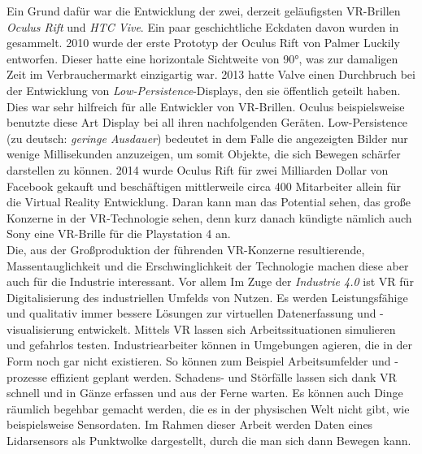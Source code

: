 Ein Grund dafür war die Entwicklung der zwei, derzeit geläufigsten VR-Brillen \textit{Oculus Rift} und \textit{HTC Vive}. Ein paar geschichtliche Eckdaten davon wurden in \cite{bib:RiftHistorical} gesammelt. 2010 wurde der erste Prototyp der Oculus Rift von Palmer Luckily entworfen. Dieser hatte eine horizontale Sichtweite von 90°, was zur damaligen Zeit im Verbrauchermarkt einzigartig war. 2013 hatte Valve einen Durchbruch bei der Entwicklung von \textit{Low-Persistence}-Displays, den sie öffentlich geteilt haben. Dies war sehr hilfreich für alle Entwickler von VR-Brillen. Oculus beispielsweise benutzte diese Art Display bei all ihren nachfolgenden Geräten. Low-Persistence (zu deutsch: \textit{geringe Ausdauer}) bedeutet in dem Falle die angezeigten Bilder nur wenige Millisekunden anzuzeigen, um somit Objekte, die sich Bewegen schärfer darstellen zu können. 2014 wurde Oculus Rift für zwei Milliarden Dollar von Facebook gekauft und beschäftigen mittlerweile circa 400 Mitarbeiter allein für die Virtual Reality Entwicklung. Daran kann man das Potential sehen, das große Konzerne in der VR-Technologie sehen, denn kurz danach kündigte nämlich auch Sony eine VR-Brille für die Playstation 4 an.\\

Die, aus der Großproduktion der führenden VR-Konzerne resultierende, Massentauglichkeit und die Erschwinglichkeit der Technologie machen diese aber auch für die Industrie interessant. Vor allem Im Zuge der \textit{Industrie 4.0} ist VR für Digitalisierung des industriellen Umfelds von Nutzen. Es werden Leistungsfähige und qualitativ immer bessere Lösungen zur virtuellen Datenerfassung und -visualisierung entwickelt. Mittels VR lassen sich Arbeitssituationen simulieren und gefahrlos testen. Industriearbeiter können in Umgebungen agieren, die in der Form noch gar nicht existieren. So können zum Beispiel Arbeitsumfelder und -prozesse effizient geplant werden. Schadens- und Störfälle lassen sich dank VR schnell und in Gänze erfassen und aus der Ferne warten. Es können auch Dinge räumlich begehbar gemacht werden, die es in der physischen Welt nicht gibt, wie beispielsweise Sensordaten. Im Rahmen dieser Arbeit werden Daten eines Lidarsensors als Punktwolke dargestellt, durch die man sich dann Bewegen kann.  




